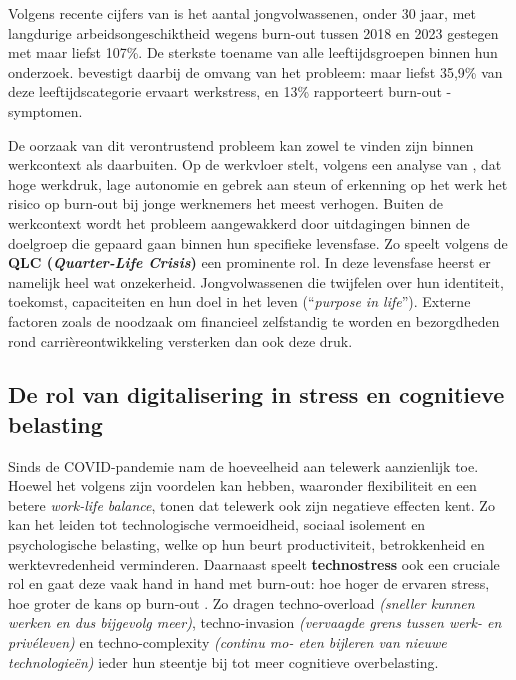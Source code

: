 \vspace{1em}

Volgens recente cijfers van \textcite{RIZIV2023_invaliditeit_burnout} is het aantal jongvolwassenen, onder 30 jaar, met langdurige arbeidsongeschiktheid wegens burn-out tussen 2018 en 2023 gestegen met maar liefst 107\%. De sterkste toename van alle leeftijdsgroepen binnen hun onderzoek. \textcite{SERV2024_werkbaarwerk} bevestigt daarbij de omvang van het probleem: maar liefst 35,9\% van deze leeftijdscategorie ervaart \newline werkstress, en 13\% rapporteert burn-out \newline -symptomen.

\vspace{1em}

De oorzaak van dit verontrustend probleem kan zowel te vinden zijn binnen werkcontext als daarbuiten. Op de werkvloer stelt, volgens een analyse van \textcite{Veen2022}, dat hoge werkdruk, lage autonomie en gebrek aan steun of erkenning op het werk het risico op burn-out bij jonge werknemers het meest verhogen. Buiten de werkcontext wordt het probleem aangewakkerd door uitdagingen binnen de doelgroep die gepaard gaan binnen hun specifieke levensfase. Zo speelt volgens \textcite{Hasyim2024} de \textbf{QLC (\emph{Quarter-Life Crisis})} een prominente rol. In deze levensfase heerst er namelijk heel wat onzekerheid. Jongvolwassenen die twijfelen over hun identiteit, toekomst, capaciteiten en hun doel in het leven (“\emph{purpose in life}”). Externe factoren zoals de noodzaak om financieel zelfstandig te worden en bezorgdheden rond carrièreontwikkeling versterken dan ook deze druk.

\vspace{1em}

\subsection{De rol van digitalisering in stress en cognitieve belasting}%
\label{subsec:digitalisering_stress}

\vspace{1em}

Sinds de COVID-pandemie nam de hoeveelheid aan telewerk aanzienlijk toe. Hoewel het volgens \textcite{Bondanini2025} zijn voordelen kan hebben, waaronder flexibiliteit en een betere \emph{work-life balance}, tonen \textcite{Costin2023} dat telewerk ook zijn negatieve effecten kent. Zo kan het leiden tot technologische vermoeidheid, sociaal isolement en psychologische belasting, welke op hun beurt productiviteit, betrokkenheid en werktevredenheid verminderen. Daarnaast speelt \textbf{technostress} ook een cruciale rol en gaat deze vaak hand in hand met burn-out: hoe hoger de ervaren stress, hoe groter de kans op burn-out \autocite{Consiglio2023}. Zo dragen techno-overload \emph{(sneller kunnen werken en dus bijgevolg meer)}, techno-invasion \emph{(vervaagde grens tussen werk- en privéleven)} en techno-complexity \emph{(continu mo- eten bijleren van nieuwe technologieën)} ieder hun steentje bij tot meer cognitieve overbelasting.

